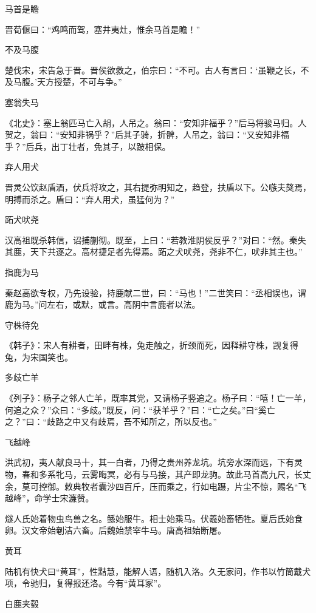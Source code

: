 \documentclass[a4paper,12pt,UTF8,twoside]{ctexbook}
\begin{document}
    马首是瞻
    
    晋荀偃曰：“鸡鸣而驾，塞井夷灶，惟余马首是瞻！”
    
    不及马腹
    
    楚伐宋，宋告急于晋。晋侯欲救之，伯宗曰：“不可。古人有言曰：‘虽鞭之长，不及马腹。’天方授楚，不可与争。”
    
    塞翁失马
    
    《北史》：塞上翁匹马亡入胡，人吊之。翁曰：“安知非福乎？”后马将骏马归。人贺之，翁曰：“安知非祸乎？”后其子骑，折髀，人吊之，翁曰：“又安知非福乎？”后兵，出丁壮者，免其子，以跛相保。
    
    弃人用犬
    
    晋灵公饮赵盾酒，伏兵将攻之，其右提弥明知之，趋登，扶盾以下。公嗾夫獒焉，明搏而杀之。盾曰：“弃人用犬，虽猛何为？”
    
    跖犬吠尧
    
    汉高祖既杀韩信，诏捕蒯彻。既至，上曰：“若教淮阴侯反乎？”对曰：“然。秦失其鹿，天下共逐之。高材捷足者先得焉。跖之犬吠尧，尧非不仁，吠非其主也。”
    
    指鹿为马
    
    秦赵高欲专权，乃先设验，持鹿献二世，曰：“马也！”二世笑曰：“丞相误也，谓鹿为马。”问左右，或默，或言。高阴中言鹿者以法。
    
    守株待免
    
    《韩子》：宋人有耕者，田畔有株，兔走触之，折颈而死，因释耕守株，觊复得兔，为宋国笑也。
    
    多歧亡羊
    
    《列子》：杨子之邻人亡羊，既率其党，又请杨子竖追之。杨子曰：“嘻！亡一羊，何追之众？”众曰：“多歧。”既反，问：“获羊乎？”曰：“亡之矣。”曰“奚亡之？”曰：“歧路之中又有歧焉，吾不知所之，所以反也。”
    
    飞越峰
    
    洪武初，夷人献良马十，其一白者，乃得之贵州养龙坑。坑旁水深而远，下有灵物，春和多系牝马，云雾晦冥，必有与马接，其产即龙驹。故此马首高九尺，长丈余，莫可控御。敕典牧者囊沙四百斤，压而乘之，行如电蹑，片尘不惊，赐名“飞越峰”，命学士宋濂赞。
    
    燧人氏始着物虫鸟兽之名。鲧始服牛。相士始乘马。伏羲始畜牺牲。夏后氏始食卵。汉文帝始剦洁六畜。后魏始禁宰牛马。唐高祖始断屠。
    
    黄耳
    
    陆机有快犬曰“黄耳”，性黠慧，能解人语，随机入洛。久无家问，作书以竹筒戴犬项，令驰归，复得报还洛。今有“黄耳冢”。
    
    白鹿夹毂
    
\end{document}
